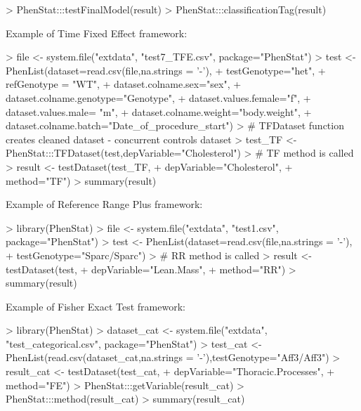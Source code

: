\documentclass[a4paper]{article}
\begin{document}
\begin{Schunk}
\begin{Sinput}
> PhenStat:::testFinalModel(result)
> PhenStat:::classificationTag(result)
\end{Sinput}
\end{Schunk}


Example of Time Fixed Effect framework:

\begin{Schunk}
\begin{Sinput}
> file <- system.file("extdata", "test7_TFE.csv", package="PhenStat")
> test <- PhenList(dataset=read.csv(file,na.strings = '-'),
+                  testGenotype="het",
+                  refGenotype = "WT",
+                  dataset.colname.sex="sex",
+                  dataset.colname.genotype="Genotype",
+                  dataset.values.female="f",
+                  dataset.values.male= "m",
+                  dataset.colname.weight="body.weight",
+                  dataset.colname.batch="Date_of_procedure_start")
> # TFDataset function creates cleaned dataset - concurrent controls dataset
> test_TF <- PhenStat:::TFDataset(test,depVariable="Cholesterol")
> # TF method is called
> result  <- testDataset(test_TF,
+                        depVariable="Cholesterol",
+                        method="TF")
> summary(result)
\end{Sinput}
\end{Schunk}

Example of Reference Range Plus framework:

\begin{Schunk}
\begin{Sinput}
> library(PhenStat)
> file <- system.file("extdata", "test1.csv", package="PhenStat")
> test <- PhenList(dataset=read.csv(file,na.strings = '-'),
+                  testGenotype="Sparc/Sparc")
> # RR method is called
> result <- testDataset(test,
+                       depVariable="Lean.Mass",
+                       method="RR")
> summary(result)
\end{Sinput}
\end{Schunk}

Example of Fisher Exact Test framework:
\begin{Schunk}
\begin{Sinput}
> library(PhenStat)
> dataset_cat <- system.file("extdata", "test_categorical.csv", package="PhenStat")
> test_cat <- PhenList(read.csv(dataset_cat,na.strings = '-'),testGenotype="Aff3/Aff3")
> result_cat <- testDataset(test_cat,
+                           depVariable="Thoracic.Processes",
+                           method="FE")
> PhenStat:::getVariable(result_cat)
> PhenStat:::method(result_cat)
> summary(result_cat)
\end{Sinput}
\end{Schunk}
\end{document}
